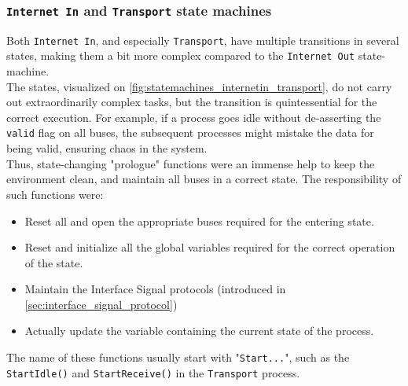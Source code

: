 \subsubsection{\texttt{Internet In} and \texttt{Transport} state machines}
Both \texttt{Internet In}, and especially \texttt{Transport}, have multiple
transitions in several states, making them a bit more complex compared to the
\texttt{Internet Out} state-machine.\\
The states, visualized on \autoref{fig:statemachines_internetin_transport}, do
not carry out extraordinarily complex tasks, but the transition is
quintessential for the correct execution. For example, if a process goes idle
without de-asserting the \texttt{valid} flag on all buses, the subsequent
processes might mistake the data for being valid, ensuring chaos in the
system.\\
Thus, state-changing "prologue" functions were an immense help to keep the
environment clean, and maintain all buses in a correct state. The responsibility
of such functions were:
\begin{itemize}
\item Reset all and open the appropriate buses required for the entering state.
\item Reset and initialize all the global variables required for the correct
operation of the state.
\item Maintain the Interface Signal protocols (introduced in \autoref{sec:interface_signal_protocol})
\item Actually update the variable containing the current state of the process.
\end{itemize}

The name of these functions usually start with "\texttt{Start...}", such as the
\texttt{StartIdle()} and \texttt{StartReceive()} in the \texttt{Transport}
process.


